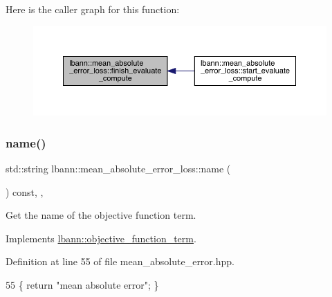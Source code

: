 Here is the caller graph for this function\+:\nopagebreak
\begin{figure}[H]
\begin{center}
\leavevmode
\includegraphics[width=350pt]{classlbann_1_1mean__absolute__error__loss_a0b6518199e86abc197e811f0a1ff7868_icgraph}
\end{center}
\end{figure}
\mbox{\label{classlbann_1_1mean__absolute__error__loss_ae44350a67a0be0357291827f194d9f77}} 
\subsubsection{\texorpdfstring{name()}{name()}}
{\footnotesize\ttfamily std\+::string lbann\+::mean\+\_\+absolute\+\_\+error\+\_\+loss\+::name (\begin{DoxyParamCaption}{ }\end{DoxyParamCaption}) const\hspace{0.3cm}{\ttfamily [inline]}, {\ttfamily [override]}, {\ttfamily [virtual]}}

Get the name of the objective function term. 

Implements \hyperlink{classlbann_1_1objective__function__term_a964fbfad3dd0434aa8f32c5fedf1079a}{lbann\+::objective\+\_\+function\+\_\+term}.



Definition at line 55 of file mean\+\_\+absolute\+\_\+error.\+hpp.


\begin{DoxyCode}
55 \{ \textcolor{keywordflow}{return} \textcolor{stringliteral}{"mean absolute error"}; \}
\end{DoxyCode}
\mbox{\label{classlbann_1_1mean__absolute__error__loss_afad15a66cbc3650767a8a1297474ac0e}} 

